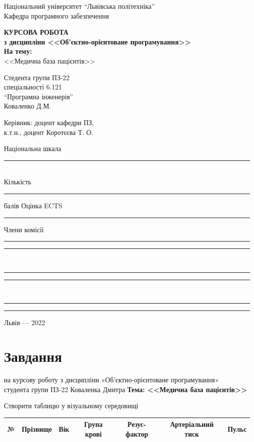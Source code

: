 \documentclass[oneside,14pt]{extarticle}
\begin{document}
\begin{titlepage}
	\begin{center}
		Національний університет “Львівська політехніка”\\
		Кафедра програмного забезпечення
		
		\vspace{170pt}
		\textbf{КУРСОВА РОБОТА}\\
		\textbf{з дисципліни <<Об’єктно-орієнтоване програмування>>}\\
		\textbf{На тему:}\\
		<<Медична база пацієнтів>>
		\vspace*{40pt}
		
		\begin{flushright}
			Стедента групи ПЗ-22\\
			спеціальності 6.121\\
			“Програмна інженерія”\\
			Коваленко Д.М.
			\bigbreak
			
			Керівник: доцент кафедри ПЗ,\\
			к.т.н., доцент Коротєєва Т. О.
			\bigbreak
			
			Національна шкала \rule{4cm}{0.15mm}\\			
			Кількість \rule{1cm}{0.15mm} балів  Оцінка ECTS \rule{1cm}{0.15mm}
			\bigbreak
			
			Члени комісії \rule{1cm}{0.15mm} \rule{4cm}{0.15mm}\\
			\rule{1cm}{0.15mm} \rule{4cm}{0.15mm}\\
			\rule{1cm}{0.15mm} \rule{4cm}{0.15mm}
		\end{flushright}
		\vspace{\fill}
		Львів — 2022
	\end{center}
\end{titlepage}
\setcounter{page}{2}
\tableofcontents
\newpage
\section*{Завдання}
\begin{center}
	на курсову роботу з дисципліни «Об’єктно-орієнтоване програмування»\\
	студента групи ПЗ-22 Коваленка Дмитра
	\bigbreak
	\textbf{Тема: <<Медична база пацієнтів>>}
\end{center}
Створити таблицю у візуальному середовищі

\begin{tabular}{|c|c|c|c|c|c|c|}
	\hline
	№ & Прізвище & Вік & Група крові & Резус-фактор & Артеріальний тиск & Пульс\\
	\hline
\end{tabular}
\end{document}
